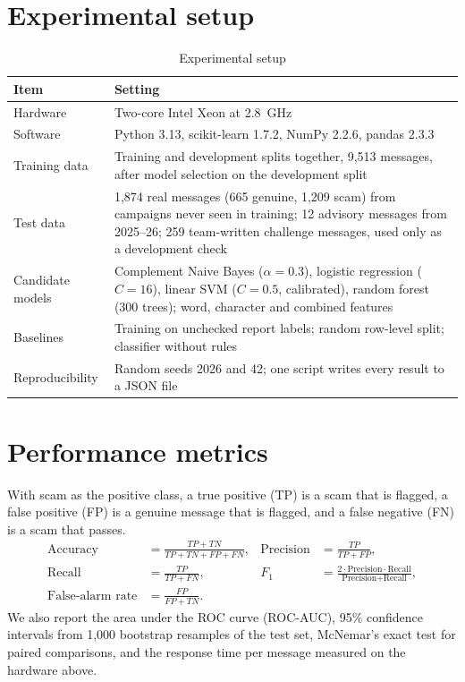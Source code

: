 \documentclass[12pt,a4paper]{report}
\begin{document}
\section{Experimental setup}
\begin{table}[H]
\centering
\caption{Experimental setup}
\label{tab:setup}
\begin{tabular}{|L{4.2cm}|L{10.1cm}|}
\hline
\textbf{Item} & \textbf{Setting} \\
\hline
Hardware & Two-core Intel Xeon at 2.8~GHz \\
\hline
Software & Python 3.13, scikit-learn 1.7.2, NumPy 2.2.6, pandas 2.3.3 \\
\hline
Training data & Training and development splits together, 9,513 messages, after model selection on the development split \\
\hline
Test data & 1,874 real messages (665 genuine, 1,209 scam) from campaigns never seen in training; 12 advisory messages from 2025--26; 259 team-written challenge messages, used only as a development check \\
\hline
Candidate models & Complement Naive Bayes ($\alpha=0.3$), logistic regression ($C=16$), linear SVM ($C=0.5$, calibrated), random forest (300 trees); word, character and combined features \\
\hline
Baselines & Training on unchecked report labels; random row-level split; classifier without rules \\
\hline
Reproducibility & Random seeds 2026 and 42; one script writes every result to a JSON file \\
\hline
\end{tabular}
\end{table}

\section{Performance metrics}
With scam as the positive class, a true positive (TP) is a scam that is flagged, a false positive (FP) is a genuine message that is flagged, and a false negative (FN) is a scam that passes.
\begin{align}
\text{Accuracy}&=\frac{TP+TN}{TP+TN+FP+FN}, & \text{Precision}&=\frac{TP}{TP+FP},\\
\text{Recall}&=\frac{TP}{TP+FN}, & F_1&=\frac{2\cdot\text{Precision}\cdot\text{Recall}}{\text{Precision}+\text{Recall}},\\
\text{False-alarm rate}&=\frac{FP}{FP+TN}. & &
\end{align}
We also report the area under the ROC curve (ROC-AUC), 95\% confidence intervals from 1,000 bootstrap resamples of the test set, McNemar's exact test for paired comparisons, and the response time per message measured on the hardware above.
\end{document}
